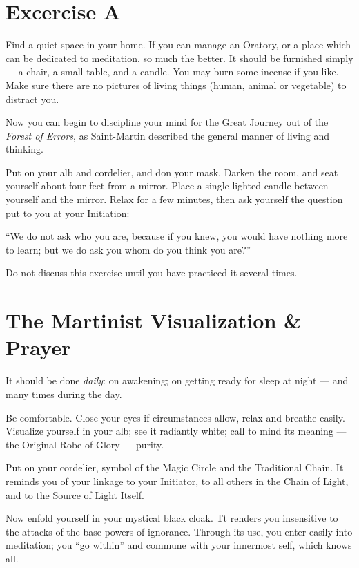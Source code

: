 \documentclass{article}
\begin{document}
\section*{Excercise A}

Find a quiet space in your home. If you can manage an Oratory, or a place which can be
dedicated to meditation, so much the better. It should be furnished simply --– a chair, a small table, and a candle. You may burn some incense if you like. Make sure there are no pictures of living things (human, animal or vegetable) to distract you.

Now you can begin to discipline your mind for the Great Journey out of the \textit{Forest of Errors}, as Saint-Martin described the general manner of living and thinking.

Put on your alb and cordelier, and don your mask. Darken the room, and seat yourself about four feet from a mirror. Place a single lighted candle between yourself and the mirror. Relax for a few minutes, then ask yourself the question put to you at your Initiation:

``We do not ask who you are, because if you knew, you would have nothing more to learn; but we do ask you whom do you think you are?''

Do not discuss this exercise until you have practiced it several times. 

\section*{The Martinist Visualization \& Prayer}

It should be done \textit{daily}: on awakening; on getting ready for sleep at night --- and many
times during the day.

Be comfortable. Close your eyes if circumstances allow, relax and breathe easily. Visualize yourself in your alb; see it radiantly white; call to mind its meaning --- the Original Robe of Glory --- purity.

Put on your cordelier, symbol of the Magic Circle and the Traditional Chain. It reminds you of your linkage to your Initiator, to all others in the Chain of Light, and to the Source of Light Itself. 

Now enfold yourself in your mystical black cloak. Tt renders you insensitive to the attacks of the base powers of ignorance. Through its use, you enter easily into meditation; you ``go within'' and commune with your innermost self, which knows all. 
\end{document}
